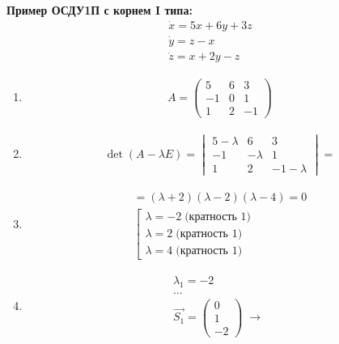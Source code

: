 \documentclass[10pt, a4paper]{article}
\begin{document}
\textbf{Пример ОСДУ1П с корнем I типа:}
\begin{gather*}
    \dot{x} = 5x + 6y + 3z \\
    \dot{y} = z - x \\
    \dot{z} = x + 2y - z
\end{gather*}
\begin{enumerate}
    \item
        \begin{gather*}
            A =
            \begin{pmatrix}
                 5 &  6 &  3 \\
                -1 &  0 &  1 \\
                 1 &  2 & -1
            \end{pmatrix}
        \end{gather*}
    \item
        \begin{gather*}
            \det{(A - \lambda E)} =
            \begin{vmatrix}
                 5 - \lambda & 6        & 3 \\
                -1           & -\lambda & 1 \\
                 1           & 2        & -1 - \lambda
            \end{vmatrix} =
        \end{gather*}
    \item
        \begin{gather*}
            = (\lambda + 2)(\lambda - 2)(\lambda - 4) = 0 \\
            \left[
                \begin{gathered}
                    \lambda = -2 \; \text{(кратность 1)} \\
                    \lambda = 2 \; \text{(кратность 1)} \\
                    \lambda = 4 \; \text{(кратность 1)}
                \end{gathered}
            \right.
        \end{gather*}
    \item
        \begin{gather*}
            \lambda_1 = -2 \\
            \dots \\
            \Vec{S_1} = \begin{pmatrix} 0 \\ 1 \\ -2 \end{pmatrix} \; \rightarrow \;

\end{gather*}
\end{enumerate}
\end{document}
